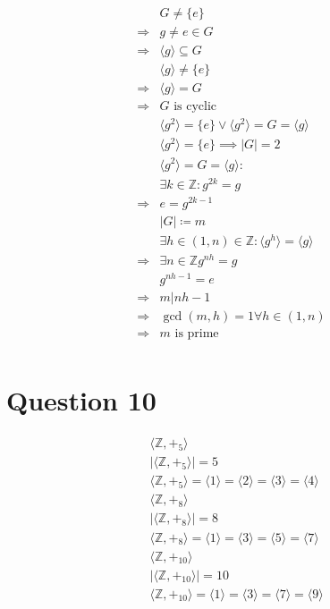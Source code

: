 \documentclass{article}
\begin{document}
\begin{equation*}
    \begin{split}
        &G\ne\{e\}\\
        \Rightarrow&g\ne e\in G\\
        \Rightarrow&\langle g\rangle\subseteq G\\
        &\langle g\rangle\ne\{e\}\\
        \Rightarrow&\langle g\rangle=G\\
        \Rightarrow&G\text{ is cyclic}\\
        &\langle g^2\rangle =\{e\}\lor \langle g^2\rangle =G=\langle g\rangle\\
        &\langle g^2\rangle =\{e\}\implies |G|=2\\
        &\langle g^2\rangle =G=\langle g\rangle:\\
        &\exists k\in \mathbb{Z} :g^{2k}=g\\
        \Rightarrow&e=g^{2k-1}\\
        &|G|\coloneqq m\\
        &\exists h\in(1,n)\in\mathbb{Z} :\langle g^h\rangle=\langle g\rangle\\
        \Rightarrow&\exists n\in\mathbb{Z} g^{nh}=g\\
        &g^{nh-1}=e\\
        \Rightarrow&m|nh-1\\
        \Rightarrow&\gcd(m,h)=1\forall h\in(1,n)\\
        \Rightarrow&m\text{ is prime}\\
    \end{split}
\end{equation*}

\newpage

\section*{Question 10}

\begin{equation*}
    \begin{split}
        &\langle\mathbb{Z},+_5\rangle\\
        &|\langle\mathbb{Z},+_5\rangle|=5\\
        &\langle\mathbb{Z} ,+_5\rangle=\langle1\rangle=\langle2\rangle=\langle3\rangle=\langle4\rangle\\
        &\langle\mathbb{Z} ,+_8\rangle\\
        &|\langle\mathbb{Z} ,+_8\rangle|=8\\
        &\langle\mathbb{Z} ,+_8\rangle=\langle1\rangle=\langle3\rangle=\langle5\rangle=\langle7\rangle\\
        &\langle\mathbb{Z} ,+_{10}\rangle\\
        &|\langle\mathbb{Z} ,+_{10}\rangle|=10\\
        &\langle\mathbb{Z} ,+_{10}\rangle=\langle1\rangle=\langle3\rangle=\langle7\rangle=\langle9\rangle\\
    \end{split}
\end{equation*}
\end{document}
